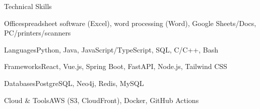 \documentclass[
	11pt
]{../../../resume}
\begin{document}
	\begin{rSection}{T}{echnical Skills}
		\begin{rSet}{Office}{spreadsheet software (Excel), word processing (Word), Google Sheets/Docs, PC/printers/scanners}
		\end{rSet}
		\begin{rSet}{Languages}{Python, Java, JavaScript/TypeScript, SQL, C/C++, Bash}
		\end{rSet}
		\begin{rSet}{Frameworks}{React, Vue.js, Spring Boot, FastAPI, Node.js, Tailwind CSS}
		\end{rSet}
		\begin{rSet}{Databases}{PostgreSQL, Neo4j, Redis, MySQL}
		\end{rSet}
		\begin{rSet}{Cloud \& Tools}{AWS (S3, CloudFront), Docker, GitHub Actions}
		\end{rSet}
	\end{rSection}
\end{document}
